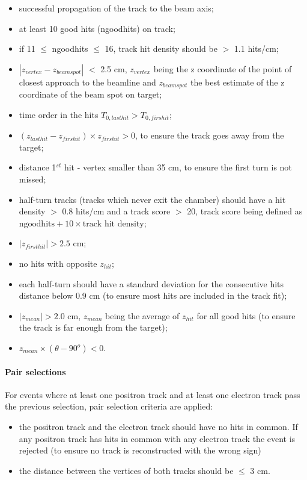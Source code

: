 \begin{refsection}
        \begin{itemize}
            \item successful propagation of the track to the beam axis;
            \item at least 10 good hits (ngoodhits) on track;
            \item if 11 $\leq$ ngoodhits $\leq$ 16, track hit density should be $>$ 1.1 hits/cm;   
            \item $|z_{vertex}-z_{beamspot}|$ $<$ 2.5 cm, $z_{vertex}$ being the z coordinate of the point of closest approach to the beamline and $z_{beamspot}$ the best estimate of the z coordinate of the beam spot on target;
            \item  time order in the hits $T_{0,lasthit}>T_{0,firshit}$;
            \item  $(z_{lasthit}-z_{firshit}) \times z_{firshit} > 0$, to ensure the track goes away from the target;
            \item distance 1$^{st}$ hit - vertex smaller than 35 cm, to ensure the first turn is not missed;
            \item half-turn tracks (tracks which never exit the chamber) should have a hit density $>$ 0.8 hits/cm and a track score $>$ 20, track score being defined as $\mbox{ngoodhits} + 10 \times \mbox{track hit density}$;
            \item  $|z_{firsthit}|>2.5$ cm;
            \item no hits with opposite $z_{hit}$;
            \item each half-turn should have a standard deviation for the consecutive hits distance below 0.9 cm (to ensure most hits are included in the track fit);
            \item $|z_{mean}|>2.0$ cm, $z_{mean}$ being the average of $z_{hit}$ for all good hits (to ensure the track is far enough from the target);
            \item $z_{mean} \times (\theta - 90^o) < 0$.
        \end{itemize}

        \paragraph{Pair selections}
        For events where at least one positron track and at least one electron track pass the previous selection, pair selection criteria are applied:
        \begin{itemize}
            \item the positron track and the electron track should have no hits in common. 
            If any positron track has hits in common with any electron track the event is rejected (to ensure no track is reconstructed with the wrong sign)
            \item the distance between the vertices of both tracks should be $\leq$ 3 cm.
        \end{itemize}



\end{refsection}
